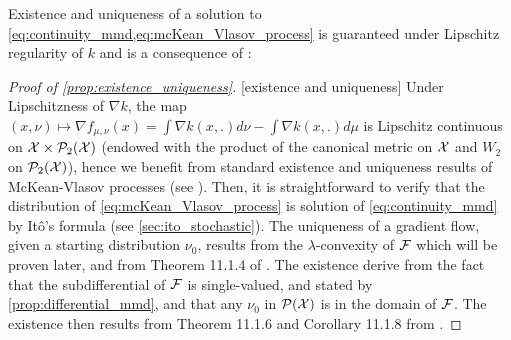 
Existence and uniqueness of a solution to \cref{eq:continuity_mmd,eq:mcKean_Vlasov_process} is guaranteed under Lipschitz regularity of $k$ and is a consequence of \cite{chizat2018global}: 
\begin{proof}[Proof of \cref{prop:existence_uniqueness}]\label{proof:prop:existence_uniqueness}[existence and uniqueness]
Under Lipschitzness of $\nabla k$, the map $(x,\nu)\mapsto \nabla f_{\mu,\nu}(x)=\int \nabla k(x,.)d \nu - \int \nabla k(x,.) d \mu$ is Lipschitz continuous on ${{\mathcal X}} \times \mathcal{P}_2({{\mathcal X}})$ (endowed with the product of the canonical metric on ${{\mathcal X}}$ and $W_2$ on $\mathcal{P}_2({{\mathcal X}})$), hence we benefit from standard existence and uniqueness results of McKean-Vlasov processes (see \cite{Jourdain:2007}). Then, it is straightforward to verify that the distribution of \eqref{eq:mcKean_Vlasov_process} is solution of \eqref{eq:continuity_mmd} by Itô's formula (see \cref{sec:ito_stochastic}). The uniqueness of a gradient flow, given a starting distribution $\nu_0$, results from the $\lambda$-convexity of ${{\mathcal F}}$ which will be proven later, and from Theorem 11.1.4 of \cite{ambrosio2008gradient}. The existence derive from the fact that the subdifferential of ${{\mathcal F}}$ is single-valued, and stated by \cref{prop:differential_mmd}, and that any $\nu_0$ in $\mathcal{P}({{\mathcal X}})$ is in the domain of ${{\mathcal F}}$. The existence then results from Theorem 11.1.6 and Corollary 11.1.8 from \cite{ambrosio2008gradient}.
\end{proof}


